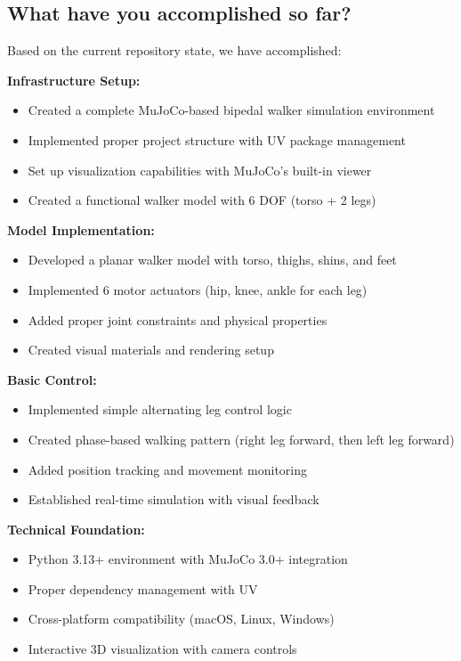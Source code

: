\documentclass{article}
\begin{document}
\subsection{What have you accomplished so far?}

Based on the current repository state, we have accomplished:

\textbf{Infrastructure Setup:}
\begin{itemize}
    \item Created a complete MuJoCo-based bipedal walker simulation environment
    \item Implemented proper project structure with UV package management
    \item Set up visualization capabilities with MuJoCo's built-in viewer
    \item Created a functional walker model with 6 DOF (torso + 2 legs)
\end{itemize}

\textbf{Model Implementation:}
\begin{itemize}
    \item Developed a planar walker model with torso, thighs, shins, and feet
    \item Implemented 6 motor actuators (hip, knee, ankle for each leg)
    \item Added proper joint constraints and physical properties
    \item Created visual materials and rendering setup
\end{itemize}

\textbf{Basic Control:}
\begin{itemize}
    \item Implemented simple alternating leg control logic
    \item Created phase-based walking pattern (right leg forward, then left leg forward)
    \item Added position tracking and movement monitoring
    \item Established real-time simulation with visual feedback
\end{itemize}

\textbf{Technical Foundation:}
\begin{itemize}
    \item Python 3.13+ environment with MuJoCo 3.0+ integration
    \item Proper dependency management with UV
    \item Cross-platform compatibility (macOS, Linux, Windows)
    \item Interactive 3D visualization with camera controls
\end{itemize}
\end{document}
